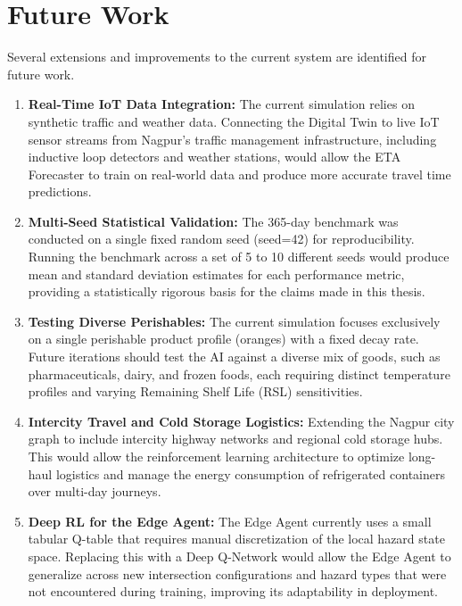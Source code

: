 \section{Future Work}

Several extensions and improvements to the current system are identified for
future work.

\begin{enumerate}
    \item \textbf{Real-Time IoT Data Integration:} The current simulation relies on
    synthetic traffic and weather data. Connecting the Digital Twin to live IoT
    sensor streams from Nagpur's traffic management infrastructure, including
    inductive loop detectors and weather stations, would allow the ETA Forecaster
    to train on real-world data and produce more accurate travel time predictions.

    \item \textbf{Multi-Seed Statistical Validation:} The 365-day benchmark was
    conducted on a single fixed random seed (seed=42) for reproducibility. Running
    the benchmark across a set of 5 to 10 different seeds would produce mean and
    standard deviation estimates for each performance metric, providing a statistically
    rigorous basis for the claims made in this thesis.

    \item \textbf{Testing Diverse Perishables:} The current simulation focuses
    exclusively on a single perishable product profile (oranges) with a fixed
    decay rate. Future iterations should test the AI against a diverse mix of
    goods, such as pharmaceuticals, dairy, and frozen foods, each requiring
    distinct temperature profiles and varying Remaining Shelf Life (RSL)
    sensitivities.

    \item \textbf{Intercity Travel and Cold Storage Logistics:} Extending the
    Nagpur city graph to include intercity highway networks and regional cold
    storage hubs. This would allow the reinforcement learning architecture to
    optimize long-haul logistics and manage the energy consumption of
    refrigerated containers over multi-day journeys.

    \item \textbf{Deep RL for the Edge Agent:} The Edge Agent currently uses a
    small tabular Q-table that requires manual discretization of the local hazard
    state space. Replacing this with a Deep Q-Network would allow the Edge Agent
    to generalize across new intersection configurations and hazard types that were
    not encountered during training, improving its adaptability in deployment.
\end{enumerate}
